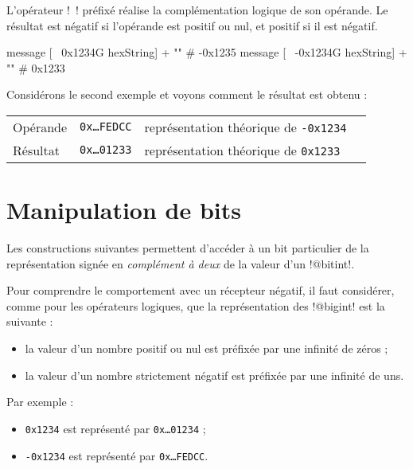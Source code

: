 L'opérateur \ggs!~! préfixé réalise la complémentation logique de son opérande. Le résultat est négatif si l'opérande est positif ou nul, et positif si il est négatif.

\begin{galgas}
message [~  0x1234G hexString] + "\n" # -0x1235
message [~ -0x1234G hexString] + "\n" # 0x1233
\end{galgas}

Considérons le second exemple et voyons comment le résultat est obtenu :

\begin{tabular}{llll}
Opérande & \texttt{0x…FEDCC} & représentation théorique de \texttt{-0x1234}\\
Résultat & \texttt{0x…01233} & représentation théorique de \texttt{0x1233} \\
\end{tabular}











\section{Manipulation de bits}

Les constructions suivantes permettent d'accéder à un bit particulier de la représentation signée en \emph{complément à deux} de la valeur d'un \ggs!@bitint!.

Pour comprendre le comportement avec un récepteur négatif, il faut considérer, comme pour les opérateurs logiques, que la représentation des \ggs!@bigint! est la suivante :
\begin{itemize}
  \item la valeur d'un nombre positif ou nul est préfixée par une infinité de zéros ;
  \item la valeur d'un nombre strictement négatif est préfixée par une infinité de uns.
\end{itemize}

Par exemple :
\begin{itemize}
  \item \texttt{0x1234} est représenté par \texttt{0x…01234} ;
  \item \texttt{-0x1234} est représenté par \texttt{0x…FEDCC}.
\end{itemize}


